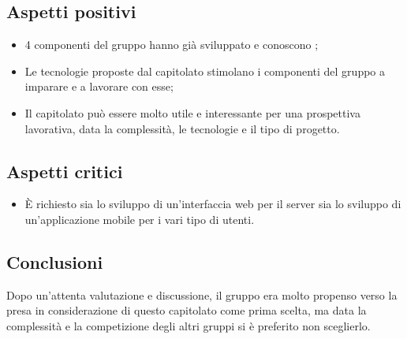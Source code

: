 \subsection{Aspetti positivi}
\begin{itemize} 
	\item 4 componenti del gruppo hanno già sviluppato e conoscono ;
	\item Le tecnologie proposte dal capitolato stimolano i componenti del gruppo a imparare e a lavorare con esse;
	\item Il capitolato può essere molto utile e interessante per una prospettiva lavorativa, data la complessità, le tecnologie e il tipo di progetto.
\end{itemize}

\subsection{Aspetti critici}
\begin{itemize}
\item È richiesto sia lo sviluppo di un'interfaccia web per il server sia lo sviluppo di un'applicazione mobile per i vari tipo di utenti.
\end{itemize}

\subsection{Conclusioni}
Dopo un'attenta valutazione e discussione, il gruppo era molto propenso verso la presa in considerazione di questo capitolato come prima scelta, ma data la complessità e la competizione degli altri gruppi si è preferito non sceglierlo.
